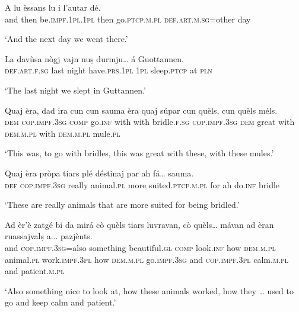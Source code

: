 \begin{linenumbers}
\gll  A lu èssans lu i l’autar dé.  \\
and then be.\textsc{impf.1pl.1pl} then go.\textsc{ptcp.m.pl} \textsc{def.art.m.sg=}other day \\
\end{linenumbers}
\medskip
\glt `And the next day we went there.'
\medskip

\begin{linenumbers}
\gll   La davùsa nògj vajn nuṣ durmju… á Guottannen. \\
 \textsc{def.art.f.sg} last night have.\textsc{prs.1pl} \textsc{1pl} sleep.\textsc{ptcp} at \textsc{pln} \\
\end{linenumbers}
\medskip
\glt `The last night we slept in Guttannen.'
\medskip

\begin{linenumbers}
\gll Quaj èra, dad ira cun cun sauma èra quaj súpar cun quèls, cun quèls méls.   \\
 \textsc{dem} \textsc{cop.impf.3sg} \textsc{comp} go.\textsc{inf} with with bridle.\textsc{f.sg} \textsc{cop.impf.3sg} \textsc{dem} great with \textsc{dem.m.pl} with \textsc{dem.m.pl} mule.\textsc{pl}  \\
\end{linenumbers}
\medskip
\glt `This was, to go with bridles, this was great with these, with these mules.'
\medskip

\begin{linenumbers}
\gll  Quaj èra pròpa tiars plé déstinaj par ah fá… sauma.  \\
 \textsc{def} \textsc{cop.impf.3sg} really animal.\textsc{pl} more suited.\textsc{ptcp.m.pl} for ah do.\textsc{inf} bridle \\
\end{linenumbers}
\medskip
\glt `These are really animals that are more suited for being bridled.'
\medskip

\begin{linenumbers}
\gll   Ad èr'è zatgé bi da mirá cò quèls tiars luvravan, cò quèls… mávan ad èran ruassajvalṣ a... pazjènts. \\
and \textsc{cop.impf.3sg}=also something beautiful.\textsc{gl} \textsc{comp} look.\textsc{inf} how \textsc{dem.m.pl}  animal.\textsc{pl} work.\textsc{impf.3pl} how \textsc{dem.m.pl} go.\textsc{impf.3sg} and   \textsc{cop.impf.3pl} calm.\textsc{m.pl} and patient.\textsc{m.pl}  \\
\end{linenumbers}
\medskip
\glt `Also something nice to look at, how these animals worked, how they … used to go and keep calm and patient.'
\medskip

